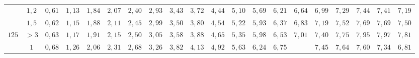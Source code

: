 \begin{table}[]
{\begin{tabular}{|c|c|c|c|c|c|c|c|c|c|c|c|c|c|c|c|c|c|c|c|}
                        & $1,2$                                                                               & \cellcolor[HTML]{FFCCC9}$0,61$ & \cellcolor[HTML]{FFCCC9}$1,13$ & \cellcolor[HTML]{FFCCC9}$1,84$ & \cellcolor[HTML]{FD6864}$2,07$ & \cellcolor[HTML]{FD6864}$2,40$ & \cellcolor[HTML]{FD6864}$2,93$ & \cellcolor[HTML]{FD6864}$3,43$ & \cellcolor[HTML]{FE0000}$3,72$ & \cellcolor[HTML]{FE0000}$4,44$ & \cellcolor[HTML]{CB0000}$5,10$ & \cellcolor[HTML]{CB0000}$5,69$ & \cellcolor[HTML]{9A0000}$6,21$ & \cellcolor[HTML]{9A0000}$6,64$                        & \cellcolor[HTML]{F8A102}$6,99$ & \cellcolor[HTML]{F8A102}$7,29$ & \cellcolor[HTML]{F56B00}$7,44$ & \cellcolor[HTML]{CE6301}$7,41$ & \cellcolor[HTML]{CE6301}$7,19$ \\ \cline{2-20} 
                        & $1,5$                                                                               & \cellcolor[HTML]{FFCCC9}$0,62$ & \cellcolor[HTML]{FFCCC9}$1,15$ & \cellcolor[HTML]{FFCCC9}$1,88$ & \cellcolor[HTML]{FD6864}$2,11$ & \cellcolor[HTML]{FD6864}$2,45$ & \cellcolor[HTML]{FD6864}$2,99$ & \cellcolor[HTML]{FD6864}$3,50$ & \cellcolor[HTML]{FE0000}$3,80$ & \cellcolor[HTML]{FE0000}$4,54$ & \cellcolor[HTML]{CB0000}$5,22$ & \cellcolor[HTML]{CB0000}$5,93$ & \cellcolor[HTML]{9A0000}$6,37$ & \cellcolor[HTML]{9A0000}$6,83$                        & \cellcolor[HTML]{F8A102}$7,19$ & \cellcolor[HTML]{F8A102}$7,52$ & \cellcolor[HTML]{F56B00}$7,69$ & \cellcolor[HTML]{CE6301}$7,69$ & \cellcolor[HTML]{CE6301}$7,50$ \\ \cline{2-20} 
\multirow{-5}{*}{$125$} & $>3$                                                                                & \cellcolor[HTML]{FFCCC9}$0,63$ & \cellcolor[HTML]{FFCCC9}$1,17$ & \cellcolor[HTML]{FFCCC9}$1,91$ & \cellcolor[HTML]{FD6864}$2,15$ & \cellcolor[HTML]{FD6864}$2,50$ & \cellcolor[HTML]{FD6864}$3,05$ & \cellcolor[HTML]{FD6864}$3,58$ & \cellcolor[HTML]{FE0000}$3,88$ & \cellcolor[HTML]{FE0000}$4,65$ & \cellcolor[HTML]{CB0000}$5,35$ & \cellcolor[HTML]{CB0000}$5,98$ & \cellcolor[HTML]{9A0000}$6,53$ & \cellcolor[HTML]{9A0000}$7,01$                        & \cellcolor[HTML]{F8A102}$7,40$ & \cellcolor[HTML]{F8A102}$7,75$ & \cellcolor[HTML]{F56B00}$7,95$ & \cellcolor[HTML]{CE6301}$7,97$ & \cellcolor[HTML]{CE6301}$7,81$ \\ \hline
                        & $1$                                                                                 & \cellcolor[HTML]{FFCCC9}$0,68$ & \cellcolor[HTML]{FFCCC9}$1,26$ & \cellcolor[HTML]{FD6864}$2,06$ & \cellcolor[HTML]{FD6864}$2,31$ & \cellcolor[HTML]{FD6864}$2,68$ & \cellcolor[HTML]{FD6864}$3,26$ & \cellcolor[HTML]{FE0000}$3,82$ & \cellcolor[HTML]{FE0000}$4,13$ & \cellcolor[HTML]{FE0000}$4,92$ & \cellcolor[HTML]{CB0000}$5,63$ & \cellcolor[HTML]{9A0000}$6,24$ & \cellcolor[HTML]{9A0000}$6,75$ & \cellcolor[HTML]{F8A102}{\color[HTML]{333333} $7,16$} & \cellcolor[HTML]{F8A102}$7,45$ & \cellcolor[HTML]{F56B00}$7,64$ & \cellcolor[HTML]{CE6301}$7,60$ & \cellcolor[HTML]{963400}$7,34$ & \cellcolor[HTML]{963400}$6,81$ \\ \cline{2-20} 

\end{tabular}}
\end{table}

